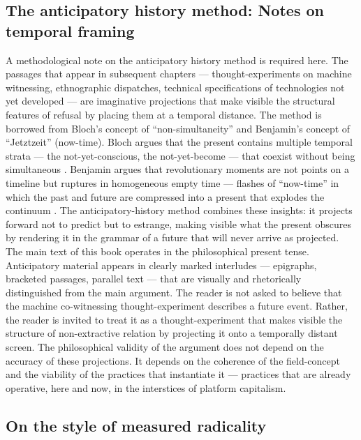 \subsection{The anticipatory history method: Notes on temporal framing}

A methodological note on the anticipatory history method is required here. The passages that appear in subsequent chapters --- thought-experiments on machine witnessing, ethnographic dispatches, technical specifications of technologies not yet developed --- are imaginative projections that make visible the structural features of refusal by placing them at a temporal distance. The method is borrowed from Bloch's concept of ``non-simultaneity'' and Benjamin's concept of ``Jetztzeit'' (now-time). Bloch argues that the present contains multiple temporal strata --- the not-yet-conscious, the not-yet-become --- that coexist without being simultaneous \cite{bloch_1932}. Benjamin argues that revolutionary moments are not points on a timeline but ruptures in homogeneous empty time — flashes of “now-time” in which the past and future are compressed into a present that explodes the continuum \cite{benjamin_1940}. The anticipatory-history method combines these insights: it projects forward not to predict but to estrange, making visible what the present obscures by rendering it in the grammar of a future that will never arrive as projected. The main text of this book operates in the philosophical present tense. Anticipatory material appears in clearly marked interludes — epigraphs, bracketed passages, parallel text — that are visually and rhetorically distinguished from the main argument. The reader is not asked to believe that the machine co-witnessing thought-experiment describes a future event. Rather, the reader is invited to treat it as a thought-experiment that makes visible the structure of non-extractive relation by projecting it onto a temporally distant screen. The philosophical validity of the argument does not depend on the accuracy of these projections. It depends on the coherence of the field-concept and the viability of the practices that instantiate it — practices that are already operative, here and now, in the interstices of platform capitalism.

\subsection{On the style of measured radicality}

